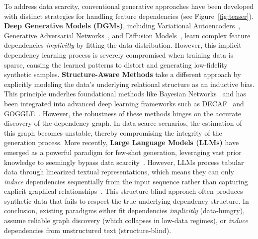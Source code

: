 To address data scarcity, conventional generative approaches have been developed with distinct strategies for handling feature dependencies (see Figure~\ref{fig:teaser}). \textbf{Deep Generative Models (DGMs)}, including Variational Autoencoders~\cite{patki2016synthetic}, Generative Adversarial Networks~\cite{xu2019modeling}, and Diffusion Models~\cite{kotelnikov2023tabddpm}, learn complex feature dependencies \textit{implicitly} by fitting the data distribution. However, this implicit dependency learning process is severely compromised when training data is sparse, causing the learned patterns to distort and generating low-fidelity synthetic samples. \textbf{Structure-Aware Methods} take a different approach by explicitly modeling the data's underlying relational structure as an inductive bias. This principle underlies foundational methods like Bayesian Networks~\cite{ankan2015pgmpy, zhang2017privbayes} and has been integrated into advanced deep learning frameworks such as DECAF~\cite{van2021decaf} and GOGGLE~\cite{liu2023goggle}. However, the robustness of these methods hinges on the accurate discovery of the dependency graph. In data-scarce scenarios, the estimation of this graph becomes unstable, thereby compromising the integrity of the generation process. More recently, \textbf{Large Language Models (LLMs)} have emerged as a powerful paradigm for few-shot generation, leveraging vast prior knowledge to seemingly bypass data scarcity~\cite{cllm2024}. However, LLMs process tabular data through linearized textual representations, which means they can only \textit{induce} dependencies sequentially from the input sequence rather than capturing explicit graphical relationships~\cite{liu2024rethinking}. This structure-blind approach often produces synthetic data that fails to respect the true underlying dependency structure. In conclusion, existing paradigms either fit dependencies \textit{implicitly} (data-hungry), assume reliable graph discovery (which collapses in low-data regimes), or \textit{induce} dependencies from unstructured text (structure-blind).




